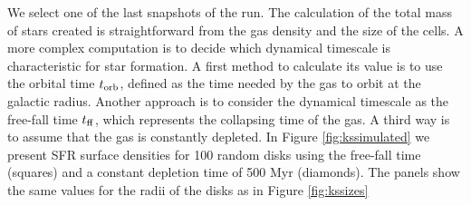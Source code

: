 \documentclass[twocolumn]{aastex}
\newcommand{\torb}{t_{\rm orb}}
\newcommand{\tff}{t_{\rm ff}}
\begin{document}
We select one of the last snapshots of the run. The calculation of the total mass of stars created is straightforward from the gas density and the size of the cells. A more complex computation is to decide which dynamical timescale is characteristic for star formation. A first method to calculate its value is to use the orbital time $\torb$, defined as the time needed by the gas to orbit at the galactic radius. Another approach is to consider the dynamical timescale as the free-fall time $\tff$, which represents the collapsing time of the gas. A third way is to assume that the gas is constantly depleted. In Figure \ref{fig:kssimulated} we present SFR surface densities for 100 random disks using the free-fall time (squares) and a constant depletion time of 500 Myr (diamonds). The panels show the same values for the radii of the disks as in Figure \ref{fig:kssizes}
\end{document}
